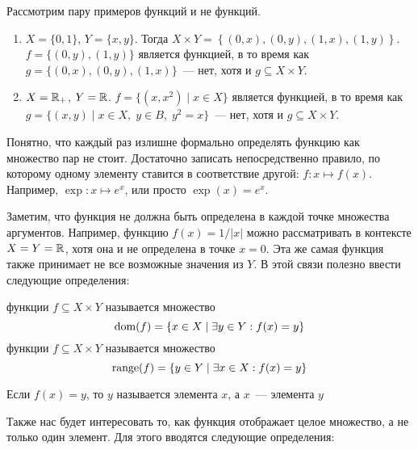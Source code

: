 \begin{example}
    Рассмотрим пару примеров функций и не функций.
    \begin{enumerate}
        \item
            $ X = \{ 0, 1 \} $, $ Y = \{ x, y \} $.
            Тогда $ X \times Y = \left\{ (0, x), (0, y), (1, x), (1, y) \right\} $.
            \newline
            $ f = \{ (0, y), (1, y) \} $ является функцией, в то время как
            $ g = \{ (0, x), (0, y), (1, x) \} $~--- нет, хотя и $ g \subseteq X \times Y $.
        \item
            $ X = \mathbb{R}_{+} $, $ Y = \mathbb{R} $.
            \newline
            $ f = \{ (x, x^2) \mid x \in X \} $ является функцией, в то время как
            $ g = \{ (x, y) \mid x \in X, \; y \in B, \; y^2 = x \} $~--- нет, хотя и $ g \subseteq X \times Y $.
    \end{enumerate}
\end{example}

Понятно, что каждый раз излишне формально определять функцию как множество пар не стоит.
Достаточно записать непосредственно правило, по которому одному элементу ставится в соответствие другой:
$ f: x \mapsto f(x) $.
Например, $ \exp: x \mapsto e^x $, или просто $ \exp(x) = e^x $.

Заметим, что функция не должна быть определена в каждой точке множества аргументов.
Например, функцию $ f(x) = 1 / |x| $ можно рассматривать в контексте $ X = Y = \mathbb{R} $, хотя она и не определена в точке $ x = 0 $.
Эта же самая функция также принимает не все возможные значения из $ Y $.
В этой связи полезно ввести следующие определения:

\begin{definition}
     функции $ f \subseteq X \times Y $ называется множество
    \[
        \operatorname*{\textnormal{dom}}(f) = \{ x \in X \mid \exists y \in Y: f(x) = y \}
    \]
     функции $ f \subseteq X \times Y $ называется множество
    \[
        \operatorname*{\textnormal{range}}(f) = \{ y \in Y \mid \exists x \in X: f(x) = y \}
    \]
\end{definition}

\begin{definition}
    Если $ f(x) = y $, то $ y $ называется  элемента $ x $, а $ x $~---  элемента $ y $
\end{definition}

Также нас будет интересовать то, как функция отображает целое множество, а не только один элемент.
Для этого вводятся следующие определения:

